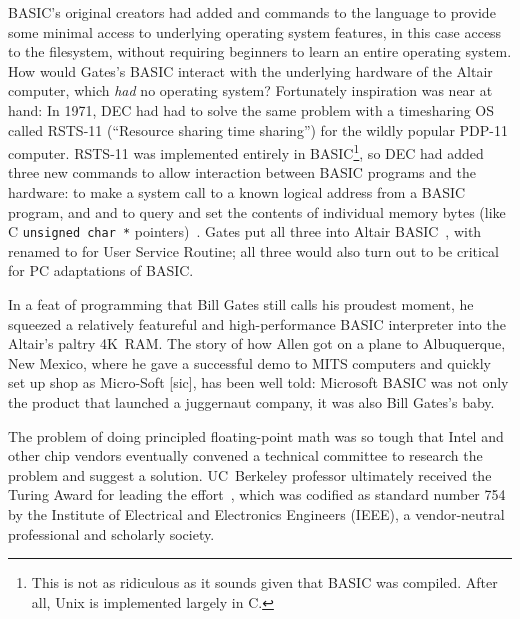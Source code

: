 BASIC's original creators had added  and  commands to the
language to
provide some minimal access to underlying operating system features, in
this case access to the filesystem,
without requiring beginners to learn an entire operating system.
How would Gates's BASIC interact with the underlying hardware of 
the Altair computer, which \emph{had} no operating
system?
Fortunately inspiration was near at hand:
In 1971, DEC had had to solve the same problem with a
timesharing OS called RSTS-11 (``Resource sharing time
sharing'') for the wildly popular PDP-11 computer.
RSTS-11 was implemented entirely in BASIC\footnote{This is not as
  ridiculous as it sounds given that BASIC was compiled.  After all,
   Unix is implemented largely in C.}, so DEC had added
three new commands to allow interaction between BASIC programs and the
hardware:  to make a system call to a
known logical address from a BASIC program, and
 and  to query and set the contents of individual memory
bytes (like C \texttt{unsigned char~*}
pointers)~\cite[pp.~204--205]{ceruzzi}.
Gates put all three into Altair BASIC~\cite{smithsonian_interview},
with  renamed to  for User Service Routine; all three
would also turn out to be critical for PC adaptations of BASIC.

In a feat of programming that Bill Gates still calls his proudest
moment, he squeezed a relatively featureful and high-performance BASIC
interpreter into the Altair's paltry 4K~RAM.
The story of how Allen got on a plane to Albuquerque, New Mexico, where
he gave a successful demo to MITS computers and quickly set up shop as
Micro-Soft [sic], has been well told: Microsoft BASIC was not only the
product that launched a juggernaut company, it was also Bill Gates's
baby.


  \begin{tangent}
  The problem of doing principled
  floating-point math was so tough that Intel 
  and other chip vendors eventually convened a technical committee to
  research the problem 
  and suggest a solution. UC~Berkeley professor 
  ultimately received the 
  Turing Award for
  leading the effort~\cite{kahan_interview}, which was codified as
  standard number 754 by the  Institute of Electrical and 
  Electronics Engineers (IEEE), a vendor-neutral professional and scholarly
  society. 
  \end{tangent}

